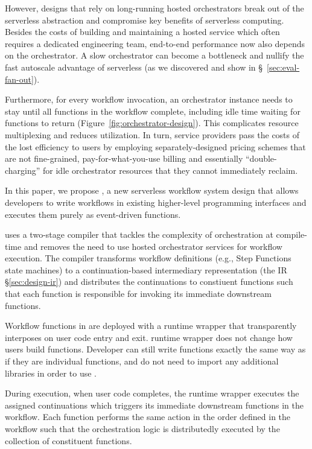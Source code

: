 However, designs that rely on long-running hosted orchestrators break out of
the serverless abstraction and compromise key benefits of serverless
computing. Besides the costs of building and maintaining a hosted service
which often requires a dedicated engineering team, end-to-end performance now
also depends on the orchestrator. A slow orchestrator can become a
bottleneck and nullify the fast autoscale advantage of serverless (as we
discovered and show in \S~\ref{sec:eval-fan-out}).

Furthermore, for every workflow invocation, an orchestrator instance needs to
stay until all functions in the workflow complete, including idle time waiting
for functions to return (Figure~\ref{fig:orchestrator-design}). This
complicates resource multiplexing and reduces utilization. In turn, service
providers pass the costs of the lost efficiency to users by employing
separately-designed pricing schemes that are not fine-grained,
pay-for-what-you-use billing and essentially ``double-charging'' for idle
orchestrator resources that they cannot immediately reclaim.

In this paper, we propose \name{}, a new serverless workflow system design
that allows developers to write workflows in existing higher-level programming
interfaces and executes them purely as event-driven functions.

\name{} uses a two-stage compiler that tackles the complexity of orchestration
at compile-time and removes the need to use hosted orchestrator services for
workflow execution. The compiler transforms workflow definitions (e.g., Step
Functions state machines) to a continuation-based intermediary representation
(the \name{} IR \S\ref{sec:design-ir}) and distributes the continuations to
constiuent functions such that each function is responsible for invoking its
immediate downstream functions.

Workflow functions in \name{} are deployed with a runtime wrapper that
transparently interposes on user code entry and exit. \name{} runtime wrapper
does not change how users build functions. Developer can still write functions
exactly the same way as if they are individual functions, and do not need to
import any additional libraries in order to use \name{}.

During execution, when user code completes, the runtime wrapper executes the
assigned continuations which triggers its immediate downstream functions in
the workflow. Each function performs the same action in the order defined in
the workflow such that the orchestration logic is distributedly executed by
the collection of constituent functions.

